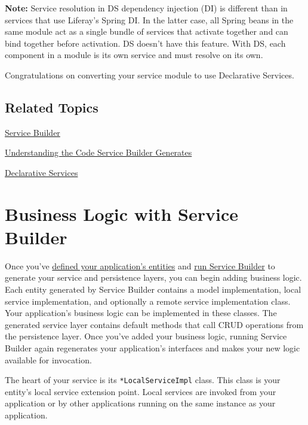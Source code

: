 \noindent\hrulefill

\textbf{Note:} Service resolution in DS dependency injection (DI) is
different than in services that use Liferay's Spring DI. In the latter
case, all Spring beans in the same module act as a single bundle of
services that activate together and can bind together before activation.
DS doesn't have this feature. With DS, each component in a module is its
own service and must resolve on its own.

\noindent\hrulefill

Congratulations on converting your service module to use Declarative
Services.

\section{Related Topics}\label{related-topics-17}

\href{/docs/7-2/appdev/-/knowledge_base/a/service-builder}{Service
Builder}

\href{/docs/7-2/appdev/-/knowledge_base/a/understanding-the-code-generated-by-service-builder}{Understanding
the Code Service Builder Generates}

\href{/docs/7-2/frameworks/-/knowledge_base/f/declarative-services}{Declarative
Services}

\chapter{Business Logic with Service
Builder}\label{business-logic-with-service-builder}

Once you've
\href{/docs/7-2/appdev/-/knowledge_base/a/creating-the-service-xml-file}{defined
your application's entities} and
\href{/docs/7-2/appdev/-/knowledge_base/a/running-service-builder}{run
Service Builder} to generate your service and persistence layers, you
can begin adding business logic. Each entity generated by Service
Builder contains a model implementation, local service implementation,
and optionally a remote service implementation class. Your application's
business logic can be implemented in these classes. The generated
service layer contains default methods that call CRUD operations from
the persistence layer. Once you've added your business logic, running
Service Builder again regenerates your application's interfaces and
makes your new logic available for invocation.

The heart of your service is its \texttt{*LocalServiceImpl} class. This
class is your entity's local service extension point. Local services are
invoked from your application or by other applications running on the
same instance as your application.

